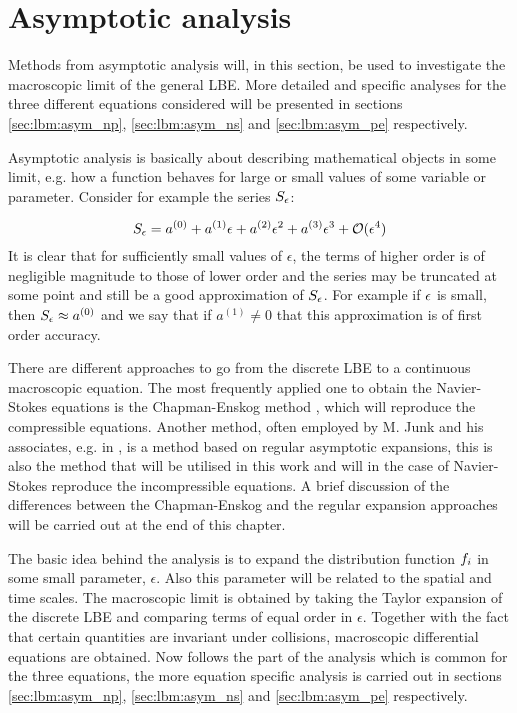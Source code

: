 \section{Asymptotic analysis}\label{sec:lbm:asym}
Methods from asymptotic analysis will, in this section, be used to
investigate the macroscopic limit of the general LBE. More detailed and
specific analyses for the three different equations considered will be
presented in sections \ref{sec:lbm:asym_np}, \ref{sec:lbm:asym_ns} and
\ref{sec:lbm:asym_pe} respectively. 

Asymptotic analysis is basically about describing mathematical objects
in some limit, e.g. how a function behaves for large or small values
of some variable or parameter. Consider for example the series $S_{\epsilon}$:

\begin{equation}
S_{\epsilon} = a^{(0)} + a^{(1)}\epsilon + a^{(2)}\epsilon^2 +
a^{(3)}\epsilon^3 + \mathcal{O}(\epsilon^4)
\end{equation}
It is clear that for sufficiently small values of $\epsilon$, the
terms of higher order is of negligible magnitude to those of lower
order and the series may be truncated at some point and still be a
good approximation of $S_{\epsilon}$. For example if $\epsilon$ is small, then
$S_{\epsilon} \approx a^{(0)}$ and we say that if $a^{(1)} \neq 0$ that
this approximation is of first order accuracy.

There are different approaches to go from the discrete LBE to a
continuous macroscopic equation. The most frequently applied one to
obtain the Navier-Stokes equations is the Chapman-Enskog method
\cite{junk-boundary}, which will reproduce the compressible
equations. Another method, often employed by M. Junk and his
associates, e.g. in \cite{junk-asym}, is a method based on regular
asymptotic expansions, this is also the method that will be utilised
in this work and will in the case of Navier-Stokes reproduce the
incompressible equations. A brief discussion of the differences
between the Chapman-Enskog and the regular expansion approaches will
be carried out at the end of this chapter.

The basic idea behind the analysis is to expand the distribution
function $f_i$ in some small parameter, $\epsilon$. Also this
parameter will be related to the spatial and time scales. The
macroscopic limit is obtained by taking the Taylor expansion of the
discrete LBE and comparing terms of equal order in
$\epsilon$. Together with the fact that certain quantities are
invariant under collisions, macroscopic differential equations are
obtained. Now follows the part of the analysis which is common for the
three equations, the more equation specific analysis is carried out in
sections \ref{sec:lbm:asym_np}, \ref{sec:lbm:asym_ns} and
\ref{sec:lbm:asym_pe} respectively.

